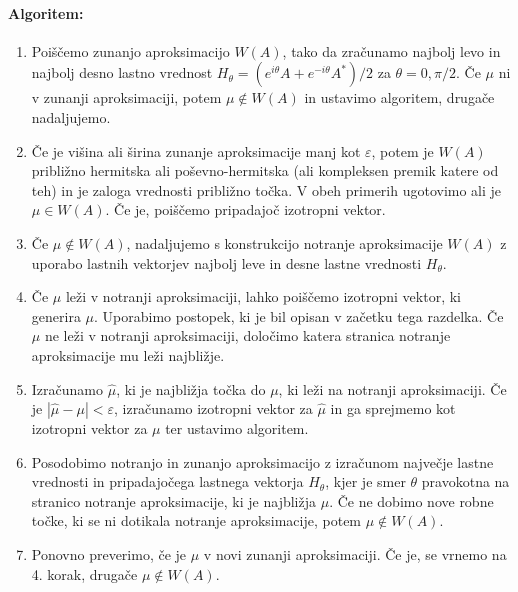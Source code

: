 \documentclass[12pt,a4paper]{amsart}
\theoremstyle{definition}
\theoremstyle{plain}
\newcommand{\abs}[1]{ \left\lvert#1\right\rvert}
\begin{document}
\paragraph{Algoritem:}
\begin{enumerate}[1.]
\item Poiščemo zunanjo aproksimacijo $W(A)$, tako da zračunamo najbolj levo in najbolj desno lastno vrednost $H_\theta =(e^{i\theta}A+e^{-i\theta}A^\ast)/2$ za $\theta =0, \pi/2$. %
Če $\mu$ ni v zunanji aproksimaciji, potem $\mu \not \in W(A)$ in ustavimo algoritem, drugače nadaljujemo.
\item Če je višina ali širina zunanje aproksimacije manj kot $\varepsilon$, potem je $W(A)$ približno hermitska ali poševno-hermitska (ali kompleksen premik katere od teh) in je zaloga vrednosti približno točka. V obeh primerih ugotovimo ali je $\mu \in W(A)$. Če je, poiščemo pripadajoč izotropni vektor. 
\item Če $\mu \not \in W(A)$, nadaljujemo s konstrukcijo notranje aproksimacije $W(A)$ z uporabo lastnih vektorjev najbolj leve in desne lastne vrednosti $H_{\theta}$.%
\item  Če $\mu$ leži v notranji aproksimaciji, lahko poiščemo izotropni vektor, ki generira $\mu$. Uporabimo postopek, ki je bil opisan v začetku tega razdelka. %
Če $\mu$ ne leži v notranji aproksimaciji, določimo katera stranica notranje aproksimacije mu leži najbližje.
\item  Izračunamo $\hat{\mu}$, ki je najbližja točka do $\mu$, ki leži na notranji aproksimaciji. Če je $\abs{\hat{\mu}-\mu}<\varepsilon$, izračunamo izotropni vektor za $\hat{\mu}$ in ga sprejmemo kot izotropni vektor za $\mu$ ter ustavimo algoritem.
\item Posodobimo notranjo in zunanjo aproksimacijo z izračunom največje lastne vrednosti in pripadajočega lastnega vektorja $H_{\theta}$, kjer je smer $\theta$ pravokotna na stranico notranje aproksimacije, ki je najbližja $\mu$. Če ne dobimo nove robne točke, ki se ni dotikala notranje aproksimacije, potem $\mu \not \in W(A)$. 
\item Ponovno preverimo, če je $\mu$  v novi zunanji aproksimaciji. Če je, se vrnemo na 4. korak, drugače $\mu \not \in W(A)$. 
\end{enumerate}
\end{document}
